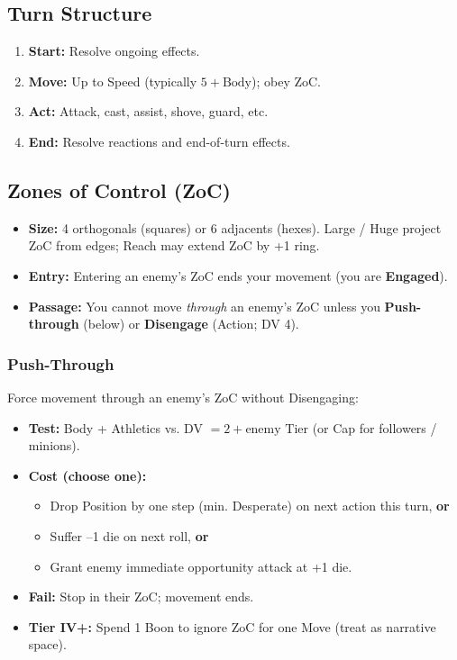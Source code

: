 \subsection{Turn Structure}
\begin{enumerate}[nosep]
    \item \textbf{Start:} Resolve ongoing effects.
    \item \textbf{Move:} Up to Speed (typically \(5 + \text{Body}\)); obey ZoC.
    \item \textbf{Act:} Attack, cast, assist, shove, guard, etc.
    \item \textbf{End:} Resolve reactions and end-of-turn effects.
\end{enumerate}

\subsection{Zones of Control (ZoC)}\label{subsec:zoc}
\begin{itemize}[nosep]
    \item \textbf{Size:} 4 orthogonals (squares) or 6 adjacents (hexes). Large / Huge project ZoC from edges; Reach may extend ZoC by +1 ring.
    \item \textbf{Entry:} Entering an enemy's ZoC ends your movement (you are \textbf{Engaged}).
    \item \textbf{Passage:} You cannot move \textit{through} an enemy's ZoC unless you \textbf{Push-through} (below) or \textbf{Disengage} (Action; DV 4).
\end{itemize}

\subsubsection*{Push-Through}
Force movement through an enemy's ZoC without Disengaging:
\begin{itemize}[nosep]
    \item \textbf{Test:} Body + Athletics vs. DV \(= 2 + \text{enemy Tier}\) (or Cap for followers / minions).
    \item \textbf{Cost (choose one):}
        \begin{itemize}[nosep,label=$\bullet$]
            \item Drop Position by one step (min. Desperate) on next action this turn, \textbf{or}
            \item Suffer --1 die on next roll, \textbf{or}
            \item Grant enemy immediate opportunity attack at +1 die.
        \end{itemize}
    \item \textbf{Fail:} Stop in their ZoC; movement ends.
    \item \textbf{Tier IV+:} Spend 1 Boon to ignore ZoC for one Move (treat as narrative space).
\end{itemize}

